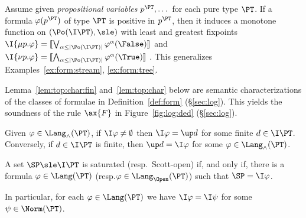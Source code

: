 \begin{example}
\label{ex:sem:modalmu}
Assume given \emph{propositional variables}
$p^\PT,\dots$ for each pure type $\PT$.
If a formula $\varphi(p^\PT)$ of type $\PT$ is positive in $p^\PT$,
then it induces a monotone function on $(\Po(\I\PT),\sle)$
with least and greatest fixpoints
\(
  \I{\mu p.\varphi}
  =
  \llbracket \bigvee_{\alpha \leq |\Po(\I\PT)|} \varphi^\alpha(\False) \rrbracket
\)
and
\(
  \I{\nu p.\varphi}
  =
  \llbracket\bigwedge_{\alpha \leq |\Po(\I\PT)|} \varphi^\alpha(\True) \rrbracket
\)
\cite[\S 20]{gtw02alig}.
This generalizes Examples~\ref{ex:form:stream}, \ref{ex:form:tree}.
\end{example}


Lemma~\ref{lem:top:char:fin} and~\ref{lem:top:char}
below are semantic characterizations of 
the classes of formulae in Definition~\ref{def:form} (\S\ref{sec:log}).
This yields the soundness of the rule $\ax{F}$
in Figure~\ref{fig:log:ded} (\S\ref{sec:log}).

\begin{lemma}
\label{lem:top:char:fin}
Given $\varphi \in \Lang_\land(\PT)$,
if $\I\varphi \neq \emptyset$ then
$\I\varphi = \up d$ for some finite $d \in \I\PT$.
Conversely, if $d \in \I\PT$ is finite, then $\up d = \I\varphi$ for some
$\varphi \in \Lang_{\land}(\PT)$.
\end{lemma}



\begin{lemma}
\label{lem:top:char}
A set $\SP \sle \I\PT$ is saturated (resp.\ Scott-open)
if, and only if, there is a formula $\varphi \in \Lang(\PT)$
(resp.\@ $\varphi \in \Lang_\Open(\PT)$)
such that $\SP = \I\varphi$.

In particular, for each $\varphi \in \Lang(\PT)$
we have $\I\varphi = \I\psi$ for some $\psi \in \Norm(\PT)$.
\end{lemma}


